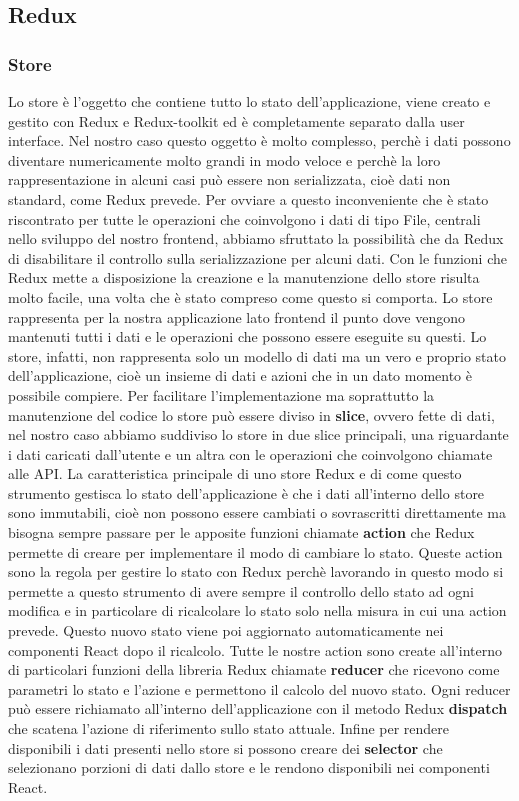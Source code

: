 \subsection{Redux}
\subsubsection{Store}
Lo store è l'oggetto che contiene tutto lo stato dell'applicazione, viene creato e gestito con Redux e Redux-toolkit ed è completamente separato dalla user interface.
Nel nostro caso questo oggetto è molto complesso, perchè i dati possono diventare numericamente molto grandi in modo veloce e perchè la loro rappresentazione in alcuni casi può
essere non serializzata, cioè dati non standard, come Redux prevede. Per ovviare a questo inconveniente che è stato riscontrato per tutte le operazioni che coinvolgono i dati di tipo File,
centrali nello sviluppo del nostro frontend, abbiamo sfruttato la possibilità che da Redux di disabilitare il controllo sulla serializzazione per alcuni dati. Con le funzioni che Redux mette a disposizione
la creazione e la manutenzione dello store risulta molto facile, una volta che è stato compreso come questo si comporta. Lo store rappresenta per la nostra applicazione lato frontend
il punto dove vengono mantenuti tutti i dati e le operazioni che possono essere eseguite su questi. Lo store, infatti, non rappresenta solo un modello di dati ma un vero e proprio stato dell'applicazione,
cioè un insieme di dati e azioni che in un dato momento è possibile compiere. Per facilitare l'implementazione ma soprattutto la manutenzione del codice lo store può essere diviso in
\textbf{slice}, ovvero fette di dati, nel nostro caso abbiamo suddiviso lo store in due slice principali, una riguardante i dati caricati dall'utente e un altra con le operazioni che
coinvolgono chiamate alle API. La caratteristica principale di uno store Redux e di come questo strumento gestisca lo stato dell'applicazione è che i dati all'interno dello store sono
immutabili, cioè non possono essere cambiati o sovrascritti direttamente ma bisogna sempre passare per le apposite funzioni chiamate \textbf{action} che Redux permette di creare per implementare
il modo di cambiare lo stato. Queste action sono la regola per gestire lo stato con Redux perchè lavorando in questo modo si permette a questo strumento di avere sempre il controllo dello stato ad ogni modifica
e in particolare di ricalcolare lo stato solo nella misura in cui una action prevede. Questo nuovo stato viene poi aggiornato automaticamente nei componenti React dopo il ricalcolo.
Tutte le nostre action sono create all'interno di particolari funzioni della libreria Redux chiamate \textbf{reducer} che ricevono come parametri lo stato e l'azione e permettono il
calcolo del nuovo stato. Ogni reducer può essere richiamato all'interno dell'applicazione con il metodo Redux \textbf{dispatch} che scatena l'azione di riferimento sullo stato attuale.
Infine per rendere disponibili i dati presenti nello store si possono creare dei \textbf{selector} che selezionano porzioni di dati dallo store e le rendono disponibili nei componenti React.

